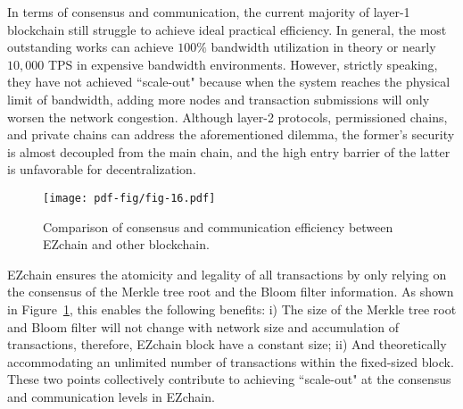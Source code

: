 \documentclass[conference]{IEEEtran}
\begin{document}
In terms of consensus and communication, the current majority of layer-1 blockchain still struggle to achieve ideal practical efficiency. In general, the most outstanding works can achieve $100\%$ bandwidth utilization in theory or nearly $10,000$ TPS in expensive bandwidth environments. However, strictly speaking, they have not achieved ``scale-out" because when the system reaches the physical limit of bandwidth, adding more nodes and transaction submissions will only worsen the network congestion. Although layer-2 protocols, permissioned chains, and private chains can address the aforementioned dilemma, the former's security is almost decoupled from the main chain, and the high entry barrier of the latter is unfavorable for decentralization.

\begin{figure}[h!]
    \centering
    \texttt{[image: pdf-fig/fig-16.pdf]}
    \caption{Comparison of consensus and communication efficiency between EZchain and other blockchain.}
    \label{fig:communication cost}
\end{figure}

EZchain ensures the atomicity and legality of all transactions by only relying on the consensus of the Merkle tree root and the Bloom filter information. As shown in Figure~\ref{fig:communication cost}, this enables the following benefits: i) The size of the Merkle tree root and Bloom filter will not change with network size and accumulation of transactions, therefore, EZchain block have a constant size; ii) And theoretically accommodating an unlimited number of transactions within the fixed-sized block. These two points collectively contribute to achieving ``scale-out" at the consensus and communication levels in EZchain.
\end{document}
